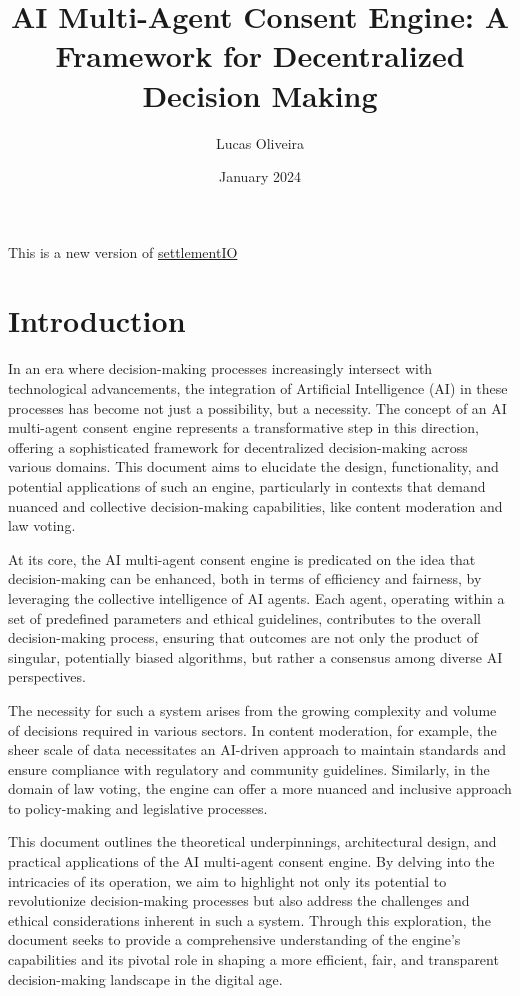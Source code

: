 \documentclass{article}
\title{AI Multi-Agent Consent Engine: A Framework for
Decentralized Decision
Making}
\author{Lucas Oliveira}
\date{January 2024}
\begin{document}
\maketitle


This is a new version of \href{https://github.com/jucasoliveira/settlementIO}{settlementIO}

\hypertarget{introduction}{%
\section*{Introduction}\label{introduction}}


In an era where decision-making processes increasingly intersect with
technological advancements, the integration of Artificial Intelligence
(AI) in these processes has become not just a possibility, but a
necessity. The concept of an AI multi-agent consent engine represents a
transformative step in this direction, offering a sophisticated
framework for decentralized decision-making across various domains. This
document aims to elucidate the design, functionality, and potential
applications of such an engine, particularly in contexts that demand
nuanced and collective decision-making capabilities, like content
moderation and law voting.

At its core, the AI multi-agent consent engine is predicated on the idea
that decision-making can be enhanced, both in terms of efficiency and
fairness, by leveraging the collective intelligence of AI agents. Each
agent, operating within a set of predefined parameters and ethical
guidelines, contributes to the overall decision-making process, ensuring
that outcomes are not only the product of singular, potentially biased
algorithms, but rather a consensus among diverse AI perspectives.

The necessity for such a system arises from the growing complexity and
volume of decisions required in various sectors. In content moderation,
for example, the sheer scale of data necessitates an AI-driven approach
to maintain standards and ensure compliance with regulatory and
community guidelines. Similarly, in the domain of law voting, the engine
can offer a more nuanced and inclusive approach to policy-making and
legislative processes.

This document outlines the theoretical underpinnings, architectural
design, and practical applications of the AI multi-agent consent engine.
By delving into the intricacies of its operation, we aim to highlight
not only its potential to revolutionize decision-making processes but
also address the challenges and ethical considerations inherent in such
a system. Through this exploration, the document seeks to provide a
comprehensive understanding of the engine's capabilities and its pivotal
role in shaping a more efficient, fair, and transparent decision-making
landscape in the digital age.
\end{document}
